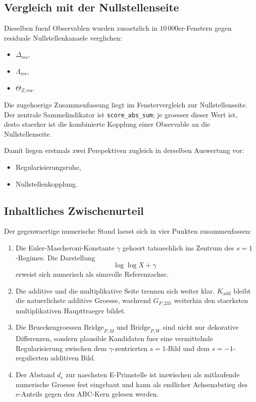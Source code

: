 \subsection{Vergleich mit der Nullstellenseite}

Dieselben fuenf Observablen wurden zusaetzlich in
$10\,000$er-Fenstern gegen residuale Nullstellenkanaele verglichen:
\begin{itemize}
\item $\Delta_{\mathrm{res}}$,
\item $\Lambda_{\mathrm{res}}$,
\item $\Theta_{Z,\mathrm{res}}$.
\end{itemize}

Die zugehoerige Zusammenfassung liegt im Fenstervergleich zur
Nullstellenseite. Der zentrale Sammelindikator ist
\texttt{score\_abs\_sum}; je groesser dieser Wert ist, desto staerker ist
die kombinierte Kopplung einer Observable an die Nullstellenseite.

Damit liegen erstmals zwei Perspektiven zugleich in derselben
Auswertung vor:
\begin{itemize}
\item Regularisierungsruhe,
\item Nullstellenkopplung.
\end{itemize}

\subsection{Inhaltliches Zwischenurteil}

Der gegenwaertige numerische Stand laesst sich in vier Punkten
zusammenfassen:
\begin{enumerate}
\item Die Euler-Mascheroni-Konstante $\gamma$ gehoert tatsaechlich ins
Zentrum des $s=1$-Regimes. Die Darstellung
\[
\log\log X+\gamma
\]
erweist sich numerisch als sinnvolle Referenzachse.

\item Die additive und die multiplikative Seite trennen sich weiter
klar. $K_{\mathrm{add}}$ bleibt die natuerlichste additive Groesse,
waehrend $G_{P,235}$ weiterhin den staerksten multiplikativen
Haupttraeger bildet.

\item Die Brueckengroessen $\mathrm{Bridge}_{P,M}$ und
$\mathrm{Bridge}_{P,W}$ sind nicht nur dekorative Differenzen, sondern
plausible Kandidaten fuer eine vermittelnde Regularisierung zwischen dem
$\gamma$-zentrierten $s=1$-Bild und dem $s=-1$-regulierten additiven
Bild.

\item Der Abstand $d_e$ zur naechsten E-Primstelle ist inzwischen als
mitlaufende numerische Groesse fest eingebaut und kann als endlicher
Achsenabstieg des e-Anteils gegen den ABC-Kern gelesen werden.
\end{enumerate}


